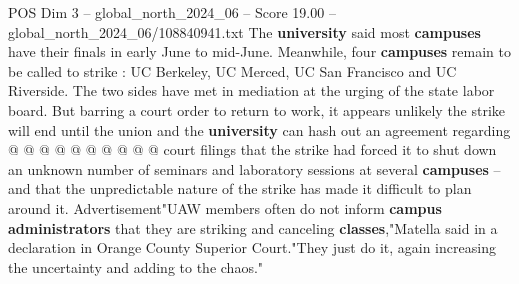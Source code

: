\begin{textsample}{POS Dim 3 – global\_north\_2024\_06 – Score 19.00 – global\_north\_2024\_06/108840941.txt}
The \textbf{university} said most \textbf{campuses} have their finals in early June to mid-June.
Meanwhile, four \textbf{campuses} remain to be called to strike : UC Berkeley, UC Merced, UC San Francisco and UC Riverside.
The two sides have met in mediation at the urging of the state labor board.
But barring a court order to return to work, it appears unlikely the strike will end until the union and the \textbf{university} can hash out an agreement regarding @ @ @ @ @ @ @ @ @ @ court filings that the strike had forced it to shut down an unknown number of seminars and laboratory sessions at several \textbf{campuses} -- and that the unpredictable nature of the strike has made it difficult to plan around it.
Advertisement"UAW members often do not inform \textbf{campus} \textbf{administrators} that they are striking and canceling \textbf{classes},"Matella said in a declaration in Orange County Superior Court."They just do it, again increasing the uncertainty and adding to the chaos."

\end{textsample}
